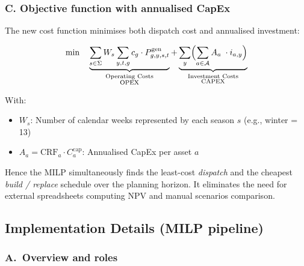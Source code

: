 \subsubsection*{C.  Objective function with annualised CapEx}
\label{ssec:MILP_objective}

\begin{adjustwidth}{1.5em}{0pt}  %
The new cost function minimises both dispatch cost and annualised investment:

\begin{equation}
    \min \quad
    \underbrace{\sum_{s \in \Sigma} W_s \sum_{y,t,g} c_g \cdot P^{\text{gen}}_{g,y,s,t}}_{\substack{\text{Operating Costs} \\ \text{OPEX}}}
    +
    \underbrace{\sum_{y}\Bigl(
    \sum_{a\in\mathcal{A}}
        A_a \;\cdot i_{a,y}\Bigr)}_{\substack{\text{Investment Costs} \\ \text{CAPEX}}}
\end{equation}

With:
\begin{itemize}
    \item $W_s$: Number of calendar weeks represented by each season $s$ (e.g., winter = 13)
    \item $A_a = \mathrm{CRF}_a \cdot C^{\text{cap}}_a$: Annualised CapEx per asset $a$
\end{itemize}

Hence the MILP simultaneously finds the least-cost \emph{dispatch} and the cheapest \emph{build / replace} schedule over the planning horizon. It eliminates the need for external spreadsheets computing NPV and manual scenarios comparison.
\end{adjustwidth}

\subsection{Implementation Details (MILP pipeline)}
\label{ssec:milp_impl}
%

\subsubsection*{A.\ Overview and roles}

